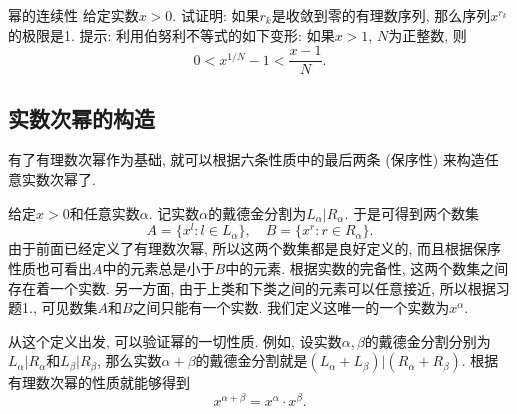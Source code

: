 \begin{exercise}{幂的连续性}
给定实数$x>0$. 试证明: 如果$r_k$是收敛到零的有理数序列, 那么序列$x^{r_k}$的极限是1. 提示: 利用伯努利不等式的如下变形: 如果$x>1$, $N$为正整数, 则
\[
0<x^{1/N}-1<\frac{x-1}{N}.
\]
\end{exercise}

\subsection{实数次幂的构造}
有了有理数次幂作为基础, 就可以根据六条性质中的最后两条 (保序性) 来构造任意实数次幂了. 

给定$x>0$和任意实数$\alpha$. 记实数$\alpha$的戴德金分割为$L_\alpha|R_\alpha$. 于是可得到两个数集
\[
A=\{x^l:l\in L_\alpha\},\quad B=\{x^r:r\in R_\alpha\}.
\]
由于前面已经定义了有理数次幂, 所以这两个数集都是良好定义的, 而且根据保序性质也可看出$A$中的元素总是小于$B$中的元素. 根据实数的完备性, 这两个数集之间存在着一个实数. 另一方面, 由于上类和下类之间的元素可以任意接近, 所以根据习题1., 可见数集$A$和$B$之间只能有一个实数. 我们定义这唯一的一个实数为$x^\alpha$.

从这个定义出发, 可以验证幂的一切性质. 例如, 设实数$\alpha,\beta$的戴德金分割分别为$L_\alpha|R_\alpha$和$L_\beta|R_\beta$, 那么实数$\alpha+\beta$的戴德金分割就是$(L_\alpha+L_\beta)|(R_\alpha+R_\beta)$. 根据有理数次幂的性质就能够得到
\[
x^{\alpha+\beta}=x^\alpha\cdot x^\beta.
\]